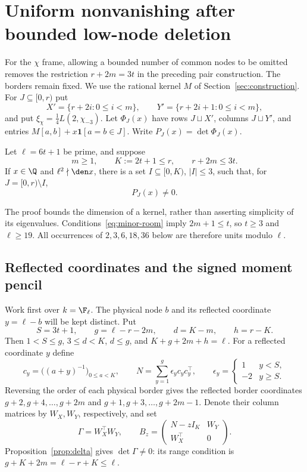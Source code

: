 \section{Uniform nonvanishing after bounded low-node deletion}\label{sec:minor-nv}

For the $\chi$ frame, allowing a bounded number of common nodes to be omitted
removes the restriction $r+2m=3t$ in the preceding pair construction. The
borders remain fixed. We use the rational kernel $M$ of
Section~\ref{sec:construction}. For $J\subseteq[0,r)$ put
\[
 X'=\{r+2i:0\le i<m\},\qquad Y'=\{r+2i+1:0\le i<m\},
\]
and put $\xi_\chi=\tfrac14L(2,\chi_{-3})$. Let $\Phi_J(x)$ have rows $J\sqcup X'$, columns $J\sqcup Y'$, and entries
$M[a,b]+x\mathbf1[a=b\in J]$. Write $P_J(x)=\det\Phi_J(x)$.

\begin{theorem}\label{thm:minor-nv}
Let $\ell=6t+1$ be prime, and suppose
\begin{equation}\label{eq:minor-room}
 m\ge1,\qquad K:=2t+1\le r,\qquad r+2m\le3t.
\end{equation}
If $x\in\Q$ and $\ell^2\nmid\den x$, there is a set $I\subseteq[0,K)$,
$|I|\le3$, such that, for $J=[0,r)\setminus I$,
\[
 P_J(x)\ne0.
\]
\end{theorem}

The proof bounds the dimension of a kernel, rather than asserting simplicity
of its eigenvalues. Conditions~\eqref{eq:minor-room} imply $2m+1\le t$, so
$t\ge3$ and $\ell\ge19$. All occurrences of $2,3,6,18,36$ below are therefore
units modulo $\ell$.

\subsection{Reflected coordinates and the signed moment pencil}
Work first over $k=\F_\ell$. The physical node $b$ and its reflected coordinate
$y=\ell-b$ will be kept distinct. Put
\[
 S=3t+1,\qquad g=\ell-r-2m,\qquad d=K-m,\qquad h=r-K.
\]
Then $1<S\le g$, $3\le d<K$, $d\le g$, and
$K+g+2m+h=\ell$. For a reflected coordinate $y$ define
\[
 c_y=\bigl((a+y)^{-1}\bigr)_{0\le a<K},\qquad
 N=\sum_{y=1}^{g}\epsilon_y c_yc_y^{\top},\qquad
 \epsilon_y=\begin{cases}1&y<S,\\-2&y\ge S.\end{cases}
\]
Reversing the order of each physical border gives the reflected border
coordinates $g+2,g+4,\ldots,g+2m$ and
$g+1,g+3,\ldots,g+2m-1$. Denote their column matrices by $W_X,W_Y$, respectively,
and set
\[
 \Gamma=W_X^{\top}W_Y,\qquad
 B_z=\begin{pmatrix}N-zI_K&W_Y\\W_X^{\top}&0\end{pmatrix}.
\]
Proposition~\ref{prop:delta} gives $\det\Gamma\ne0$: its range condition is
$g+K+2m=\ell-r+K\le\ell$.

